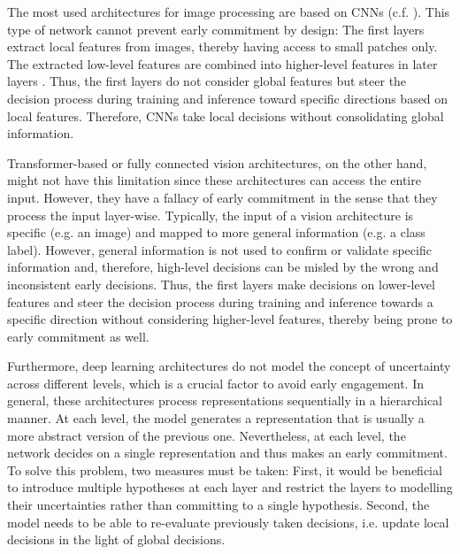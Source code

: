 The most used architectures for image processing are based on CNNs (c.f. ). This type of network cannot prevent early commitment by design: The first layers extract local features from images, thereby having access to small patches only. The extracted low-level features are combined into higher-level features in later layers . Thus, the first layers do not consider global features but steer the decision process during training and inference toward specific directions based on local features. Therefore, CNNs take local decisions without consolidating global information.

Transformer-based  or fully connected  vision architectures, on the other hand, might not have this limitation since these architectures can access the entire input.
However, they have a fallacy of early commitment in the sense that they process the input layer-wise. Typically, the input of a vision architecture is specific (e.g. an image) and mapped to more general information (e.g. a class label).
However, general information is not used to confirm or validate specific information and, therefore, high-level decisions can be misled by the wrong and inconsistent early decisions.
Thus, the first layers make decisions on lower-level features and steer the decision process during training and inference towards a specific direction without considering higher-level features, thereby being prone to early commitment as well.

Furthermore, deep learning architectures do not model the concept of uncertainty across different levels, which is a crucial factor to avoid early engagement. In general, these architectures process representations sequentially in a hierarchical manner. At each level, the model generates a representation that is usually a more abstract version of the previous one. Nevertheless, at each level, the network decides on a single representation and thus makes an early commitment. To solve this problem, two measures must be taken: First, it would be beneficial to introduce multiple hypotheses at each layer and restrict the layers to modelling their uncertainties rather than committing to a single hypothesis. Second, the model needs to be able to re-evaluate previously taken decisions, i.e. update local decisions in the light of global decisions.

